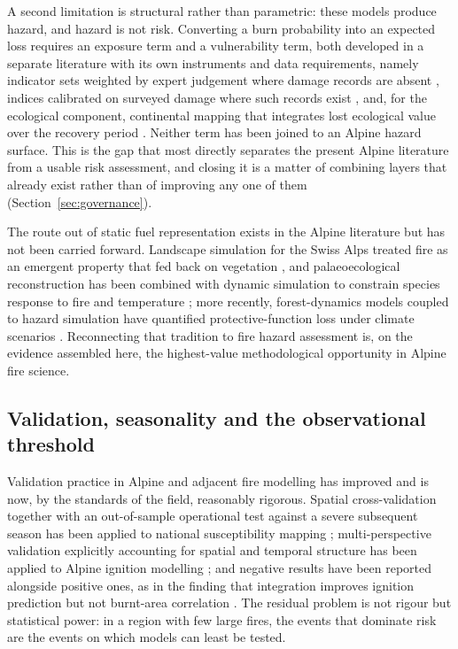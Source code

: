 \documentclass[11pt,a4paper]{article}
\begin{document}
A second limitation is structural rather than parametric: these models produce hazard, and hazard is not risk. Converting a burn probability into an expected loss requires an exposure term and a vulnerability term, both developed in a separate literature with its own instruments and data requirements, namely indicator sets weighted by expert judgement where damage records are absent \citep{papathomakohle_towards_2025}, indices calibrated on surveyed damage where such records exist \citep{papathomakohle_wildfire_2022}, and, for the ecological component, continental mapping that integrates lost ecological value over the recovery period \citep{arrogantefunes_mapping_2024}. Neither term has been joined to an Alpine hazard surface. This is the gap that most directly separates the present Alpine literature from a usable risk assessment, and closing it is a matter of combining layers that already exist rather than of improving any one of them (Section~\ref{sec:governance}).

The route out of static fuel representation exists in the Alpine literature but has not been carried forward. Landscape simulation for the Swiss Alps treated fire as an emergent property that fed back on vegetation \citep{schumacher_relative_2006}, and palaeoecological reconstruction has been combined with dynamic simulation to constrain species response to fire and temperature \citep{colombaroli_species_2010}; more recently, forest-dynamics models coupled to hazard simulation have quantified protective-function loss under climate scenarios \citep{hillebrand_contrasting_2023, moos_climate_2021}. Reconnecting that tradition to fire hazard assessment is, on the evidence assembled here, the highest-value methodological opportunity in Alpine fire science.

\subsection{Validation, seasonality and the observational threshold}

Validation practice in Alpine and adjacent fire modelling has improved and is now, by the standards of the field, reasonably rigorous. Spatial cross-validation together with an out-of-sample operational test against a severe subsequent season has been applied to national susceptibility mapping \citep{trucchia_defining_2022}; multi-perspective validation explicitly accounting for spatial and temporal structure has been applied to Alpine ignition modelling \citep{moreno_1_nodate}; and negative results have been reported alongside positive ones, as in the finding that integration improves ignition prediction but not burnt-area correlation \citep{muller_towards_2020}. The residual problem is not rigour but statistical power: in a region with few large fires, the events that dominate risk are the events on which models can least be tested.
\end{document}
